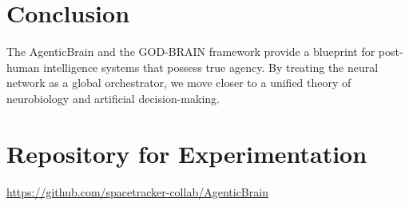 \documentclass[12pt]{article}
\begin{document}
\section{Conclusion}
The AgenticBrain and the GOD-BRAIN framework provide a blueprint for post-human intelligence systems that possess true agency. By treating the neural network as a global orchestrator, we move closer to a unified theory of neurobiology and artificial decision-making.

\section{Repository for Experimentation}
\noindent
\url{https://github.com/spacetracker-collab/AgenticBrain}
\end{document}
